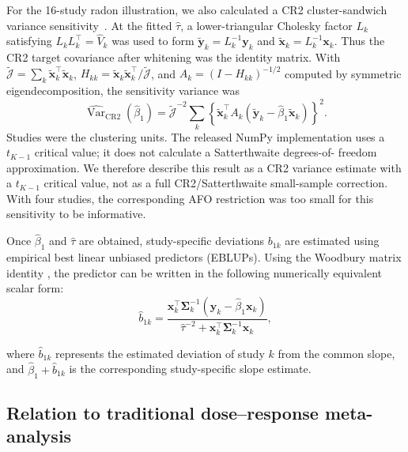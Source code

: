 \documentclass[journal=rsm]{CUP-JNL-DTM}%
\theoremstyle{definition}
\numberwithin{equation}{section}
\begin{document}
For the 16-study radon illustration, we also calculated a CR2
cluster-sandwich variance sensitivity~\cite{PustejovskyTipton2018}. At the
fitted $\widehat\tau$, a lower-triangular Cholesky factor $L_k$ satisfying
$L_kL_k^\top=\widehat V_k$ was used to form
$\widetilde{\mathbf y}_k=L_k^{-1}\mathbf y_k$ and
$\widetilde{\mathbf x}_k=L_k^{-1}\mathbf x_k$. Thus the CR2 target covariance
after whitening was the identity matrix. With
$\widetilde{\mathcal J}=\sum_k\widetilde{\mathbf x}_k^\top
\widetilde{\mathbf x}_k$,
$H_{kk}=\widetilde{\mathbf x}_k\widetilde{\mathbf x}_k^\top/
\widetilde{\mathcal J}$, and
$A_k=(I-H_{kk})^{-1/2}$ computed by symmetric eigendecomposition, the
sensitivity variance was
\[
 \widehat{\operatorname{Var}}_{\mathrm{CR2}}(\widehat\beta_1)
 =\widetilde{\mathcal J}^{-2}\sum_k
 \left\{\widetilde{\mathbf x}_k^\top A_k
 (\widetilde{\mathbf y}_k-\widehat\beta_1\widetilde{\mathbf x}_k)\right\}^2.
\]
Studies were the clustering units. The released NumPy implementation uses a
$t_{K-1}$ critical value; it does not calculate a Satterthwaite degrees-of-
freedom approximation. We therefore describe this result as a CR2 variance
estimate with a $t_{K-1}$ critical value, not as a full CR2/Satterthwaite
small-sample correction. With four studies, the corresponding AFO restriction
was too small for this sensitivity to be informative.
 
Once $\hat{\beta}_1$ and $\hat{\tau}$ are obtained, study-specific deviations $b_{1k}$ are estimated using empirical best linear unbiased predictors (EBLUPs). Using the Woodbury matrix identity \cite{Harville1997}, the predictor can be written in the following numerically equivalent scalar form:
%
\begin{equation}
  \hat{b}_{1k}
  = \frac{
      \mathbf{x}_k^\top \boldsymbol{\Sigma}_k^{-1}
      \left(\mathbf{y}_k - \hat{\beta}_1 \mathbf{x}_k\right)
    }{
      \hat{\tau}^{-2} + \mathbf{x}_k^\top
      \boldsymbol{\Sigma}_k^{-1} \mathbf{x}_k
    },
  \label{eq:eblup}
\end{equation}
%

where $\hat{b}_{1k}$ represents the estimated deviation of study $k$ from the common slope, and $\hat{\beta}_1 + \hat{b}_{1k}$ is the corresponding study-specific slope estimate.


\subsection{Relation to traditional dose--response meta-analysis}
\label{sec:relation}
 
\end{document}
